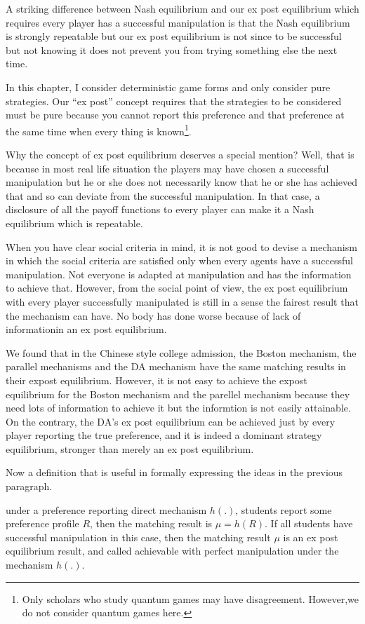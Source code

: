 A striking difference between Nash equilibrium and our ex post equilibrium which requires every player has a successful manipulation is that the Nash equilibrium is strongly repeatable but our ex post equilibrium is not since to be successful but not knowing it does not prevent you from trying something else the next time.


In this chapter, I consider deterministic game forms and only consider pure strategies. Our ``ex post'' concept requires that the strategies to be considered must be pure because you cannot report this preference and that preference at the same time when every thing is known\footnote{Only scholars who study quantum games may have disagreement. However,we do not consider quantum games here.}.

Why the concept of ex post equilibrium  deserves a special mention? Well, that is because in most real life situation the players may have chosen a successful manipulation but he or she does not necessarily know that he or she has achieved that and so can deviate from the successful manipulation. In that case, a disclosure of all the payoff functions to every player can make it a Nash equilibrium which is repeatable.   


 
When you have clear social criteria in mind, it is not good to devise a mechanism in which the social criteria are satisfied only when every agents have a successful manipulation. Not everyone 
is adapted at manipulation and has the information to achieve that. However, from the social point of view, the ex post equilibrium with every player successfully manipulated is still in a sense the fairest result that the mechanism can have. No body has done worse because of lack of informationin an ex post equilibrium.


We found that in the Chinese style college admission, the Boston mechanism, the parallel mechanisms and the DA mechanism have the same matching results in their expost equilibrium. However, it is not 
easy to achieve the expost equilibrium for the Boston mechanism and the parellel mechanism because they need lots of information to achieve it but the informtion is not easily attainable. On the contrary, the DA's ex post equilibrium can be achieved just by every player reporting the true preference, and it is indeed a dominant strategy equilibrium, stronger than merely an ex post equilibrium.

Now a definition that is useful in formally expressing the ideas in the previous paragraph.
\begin{definition}
under a preference reporting direct mechanism $h(.)$, students report some preference profile $R$, then the matching result is $\mu=h(R)$.
If all students have successful manipulation in this case, then the matching result $\mu$ is an ex post equilibrium result, and called achievable with perfect manipulation under the mechanism $h(.)$.
\end{definition}

